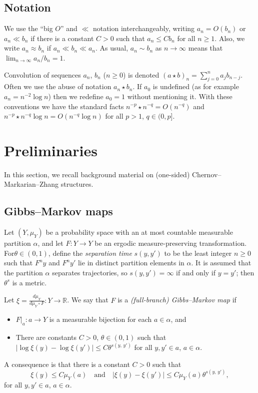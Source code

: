 \documentclass[10pt]{amsart}
\theoremstyle{definition}\newtheorem{defi}[theo]{Definition}\newtheorem{rema}[theo]{Remark}\newtheorem{exam}[theo]{Example}\newtheorem{exem}[theo]{Example}\newtheorem{nota}[theo]{Notation}
\newcommand{\R}{\mathbb{R}}
\begin{document}
\subsection*{Notation}
We use the ``big $O$'' and $\ll$ notation interchangeably, writing $a_n=O(b_n)$ or $a_n\ll b_n$ if there is a constant $C>0$ such that $a_n\le Cb_n$ for all $n\ge1$. Also, we write $a_n\approx b_n$ if $a_n\ll b_n\ll a_n$. As usual, $a_n\sim b_n$ as $n\to\infty$ means that $\lim_{n\to\infty}a_n/b_n=1$.

Convolution of sequences $a_n$, $b_n$ ($n\ge0$) is denoted $(a\star b)_n=\sum_{j=0}^n a_j b_{n-j}$. Often we use the abuse of notation $a_n\star b_n$. If $a_0$ is undefined (as for example $a_n=n^{-2}\log n$) then we redefine $a_0=1$ without mentioning it. With these conventions we have the standard facts $n^{-p}\star n^{-q}=O(n^{-q})$ and $n^{-p}\star n^{-q}\log n=O(n^{-q}\log n)$ for all $p>1$, $q\in(0,p]$.


\section{Preliminaries}\label{sec:prel}

In this section, we recall background material on (one-sided) Chernov--Markarian--Zhang structures.

\subsection{Gibbs--Markov maps}

Let $(Y,\mu_Y)$ be a probability space with an at most countable measurable partition $\alpha$, and let $F:Y\to Y$ be an ergodic measure-preserving transformation. For\linebreak$\theta\in(0,1)$, define the \emph{separation time} $s(y,y')$ to be the least integer $n\ge0$ such that $F^ny$ and $F^ny'$ lie in distinct partition elements in $\alpha$. It is assumed that the partition $\alpha$ separates trajectories, so $s(y,y')=\infty$ if and only if $y=y'$; then $\theta^s$ is a metric.

Let $\xi=\frac{d\mu_Y}{d\mu_Y\circ F}:Y\to\R$. We say that $F$ is a \emph{(full-branch) Gibbs--Markov map} if
\begin{itemize}
\item $F|_a:a\to Y$ is a measurable bijection for each $a\in\alpha$, and
\item There are constants $C>0$, $\theta\in(0,1)$ such that $|\log\xi(y)-\log\xi(y')|\le C\theta^{s(y,\,y')}$ for all $y,y'\in a$, $a\in\alpha$.
\end{itemize}
A consequence is that there is a constant $C>0$ such that
\begin{equation}\label{eq:GM}
\xi(y)\le C\mu_Y(a) \quad\text{and} \quad |\xi(y)-\xi(y')|\le C\mu_Y(a)\theta^{s(y,\,y')},
\end{equation}
for all $y,y'\in a$, $a\in\alpha$.
\end{document}
